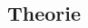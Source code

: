 \documentclass[12pt,a4paper]{article}
\begin{document}
\begin{multicols}{2}




%			
%


\section{Theorie}

\end{multicols}
\end{document}

